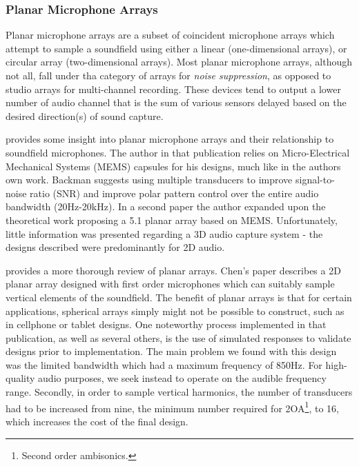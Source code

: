 \subsubsection{Planar Microphone Arrays}

Planar microphone arrays are a subset of coincident microphone arrays which attempt to sample a soundfield using either a linear (one-dimensional arrays), or circular array (two-dimensional arrays). Most planar microphone arrays, although not all, fall under tha category of arrays for \textit{noise suppression}, as opposed to studio arrays for multi-channel recording. These devices tend to output a lower number of audio channel that is the sum of various sensors delayed based on the desired direction(s) of sound capture. 

\cite{backman2006miniature} provides some insight into planar microphone arrays and their relationship to soundfield microphones. The author in that publication relies on Micro-Electrical Mechanical Systems (MEMS) capsules for his designs, much like in the authors own work. Backman suggests using multiple transducers to improve signal-to-noise ratio (SNR) and improve polar pattern control over the entire audio bandwidth (20Hz-20kHz). In a second paper \cite{backman2006gradient} the author expanded upon the theoretical work proposing a 5.1 planar array based on MEMS. Unfortunately, little information was presented regarding a 3D audio capture system - the designs described were predominantly for 2D audio. 


\cite{chen2015theory} provides a more thorough review of planar arrays. Chen's paper describes a 2D planar array designed with first order microphones which can suitably sample vertical elements of the soundfield. The benefit of planar arrays is that for certain applications, spherical arrays simply might not be possible to construct, such as in cellphone or tablet designs. One noteworthy process implemented in that publication, as well as several others, is the use of simulated responses to validate designs prior to implementation. The main problem we found with this design was the limited bandwidth which had a maximum frequency of 850Hz. For high-quality audio purposes, we seek instead to operate on the audible frequency range. Secondly, in order to sample vertical harmonics, the number of transducers had to be increased from nine, the minimum number required for 2OA\footnote{Second order ambisonics.}, to 16, which increases the cost of the final design. 

